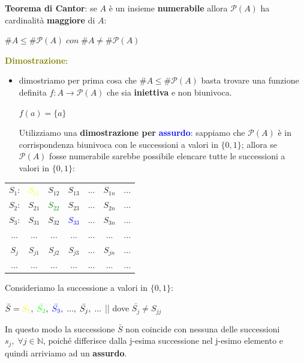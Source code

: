 \textbf{Teorema di Cantor}: se $A$ è un insieme \textbf{numerabile} allora $\mathcal{P}(A)$ ha cardinalità \textbf{maggiore} di $A$:
\begin{center}
    $\#A \leq \#\mathcal{P}(A) \; con \; \#A \neq \#\mathcal{P}(A)$
\end{center}
\textcolor{olive}{\textbf{Dimostrazione}}: 
\begin{itemize}[nosep]
    \item dimostriamo per prima cosa che $\#A \leq \#\mathcal{P}(A)$ basta trovare una funzione definita $f : A \rightarrow \mathcal{P}(A)$ che sia \textbf{iniettiva} e non biunivoca.
    \begin{center}
        $f(a) = \{a\}$
    \end{center}
    Utilizziamo una \textbf{dimostrazione per} \textcolor{blue}{\textbf{assurdo}}: sappiamo che $\mathcal{P}(A)$ è in corrispondenza biunivoca con le successioni a valori in $\{0,1\}$; allora se $\mathcal{P}(A)$ fosse numerabile sarebbe possibile elencare tutte le successioni a valori in $\{0,1\}$:
\end{itemize}
\begin{center}
    \begin{tabular}{ccccccc}
        $S_1$: & \textcolor{yellow}{$S_{11}$} & $S_{12}$ & $S_{13}$ & ... & $S_{1n}$ & ... \\
        $S_2$: & $S_{21}$ & \textcolor{green}{$S_{22}$} & $S_{23}$ & ... & $S_{2n}$ & ... \\
        $S_3$: & $S_{31}$ & $S_{32}$ & \textcolor{blue}{$S_{33}$} & ... & $S_{3n}$ & ... \\
        ... & ... & ... & ... & ... & ... & ... \\
        $S_j$ & $S_{j1}$ & $S_{j2}$ & $S_{j3}$ & ... & $S_{jn}$ & ... \\
        ... & ... & ... & ... & ... & ... & ... \\
    \end{tabular}
\end{center}
Consideriamo la successione a valori in $\{0, 1\}$:
\begin{center}
    $\bar{S} = \textcolor{yellow}{\bar{S_1}}, \; \textcolor{green}{\bar{S_2}}, \; \textcolor{blue}{\bar{S_3}}, \; ..., \; \bar{S_j}, \; ...$ || dove $\bar{S_j} \neq S_{jj}$
\end{center}
In questo modo la successione $\bar{S}$ non coincide con nessuna delle successioni $s_j, \; \forall j \in \mathbb{N}$, poiché differisce dalla j-esima successione nel j-esimo elemento e quindi arriviamo ad un \textbf{assurdo}.
